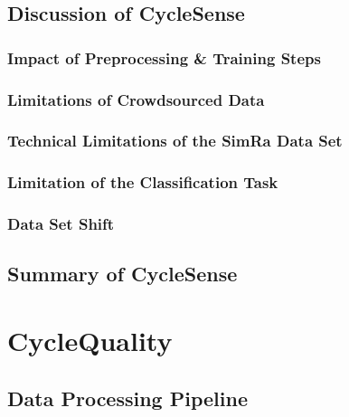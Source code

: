 \subsection{Discussion of CycleSense}
\label{sec:discussion_cyclesense}


\subsubsection{Impact of Preprocessing \& Training Steps}
\label{sec:impact_of_preprocessing_and_training_steps}

\subsubsection{Limitations of Crowdsourced Data}
\label{sec:limitations_of_crowdsourced_data}

\subsubsection{Technical Limitations of the SimRa Data Set}
\label{sec:technical_limitations_of_the_simra_data_set}

\subsubsection{Limitation of the Classification Task}
\label{sec:limitation_of_the_classification_task}

\subsubsection{Data Set Shift}
\label{sec:data_set_shift}


\subsection{Summary of CycleSense}
\label{sec:summary_cyclesense}



\section{CycleQuality}
\label{sec:cyclequality}



\subsection{Data Processing Pipeline}
\label{sec:data_processing_pipeline}


